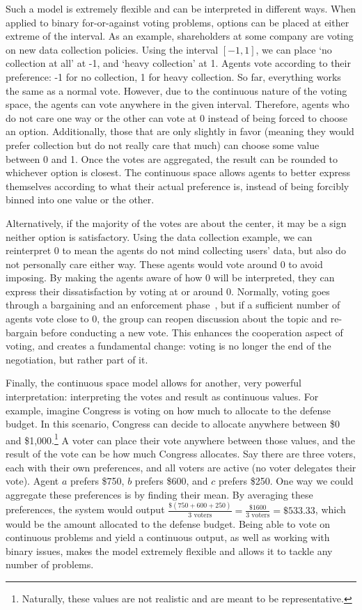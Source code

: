 Such a model is extremely flexible and can be interpreted in different ways.
When applied to binary for-or-against voting problems, options can be placed at either
extreme of the interval.
As an example, shareholders at some company are voting on new data collection policies.
Using the interval $[-1, 1]$, we can place `no collection at all' at -1, and `heavy
collection' at 1.
Agents vote according to their preference: -1 for no collection, 1 for heavy collection.
So far, everything works the same as a normal vote.
However, due to the continuous nature of the voting space, the agents can vote
anywhere in the given interval.
Therefore, agents who do not care one way or the other can vote at 0 instead of being
forced to choose an option.
Additionally, those that are only slightly in favor (meaning they would prefer
collection but do not really care that much) can choose some value between 0 and 1.
Once the votes are aggregated, the result can be rounded to whichever option is
closest.
The continuous space allows agents to better express themselves according to what
their actual preference is, instead of being forcibly binned into one value or the
other.

Alternatively, if the majority of the votes are about the center, it may be a sign
neither option is satisfactory.
Using the data collection example, we can reinterpret 0 to mean the agents do not
mind collecting users' data, but also do not personally care either way.
These agents would vote around 0 to avoid imposing.
By making the agents aware of how 0 will be interpreted, they can express their
dissatisfaction by voting at or around 0.
Normally, voting goes through a bargaining and an enforcement
phase~\cite{Fearon1998}, but if a sufficient number of agents vote close to 0, the
group can reopen discussion about the topic and re-bargain before conducting a new vote.
This enhances the cooperation aspect of voting, and creates a fundamental change:
voting is no longer the end of the negotiation, but rather part of it.

Finally, the continuous space model allows for another, very powerful interpretation:
interpreting the votes and result as continuous values.
For example, imagine Congress is voting on how much to allocate to the defense budget.
In this scenario, Congress can decide to allocate anywhere between \$0 and \$1,000.\footnote{
    Naturally, these values are not realistic and are meant to be representative.
}
A voter can place their vote anywhere between those values, and the result of the
vote can be how much Congress allocates.
Say there are three voters, each with their own preferences, and all voters are
active (no voter delegates their vote).
Agent $a$ prefers \$750, $b$ prefers \$600, and $c$ prefers \$250.
One way we could aggregate these preferences is by finding their mean.
By averaging these preferences, the system would output
$\frac{\$(750 + 600 + 250)}{3 \text{ voters}} = \frac{\$1600}{3 \text{ voters}} =
\$533.33$,
which would be the amount allocated to the defense budget.
Being able to vote on continuous problems and yield a continuous output, as well as
working with binary issues, makes the model extremely flexible and allows it to
tackle any number of problems.

